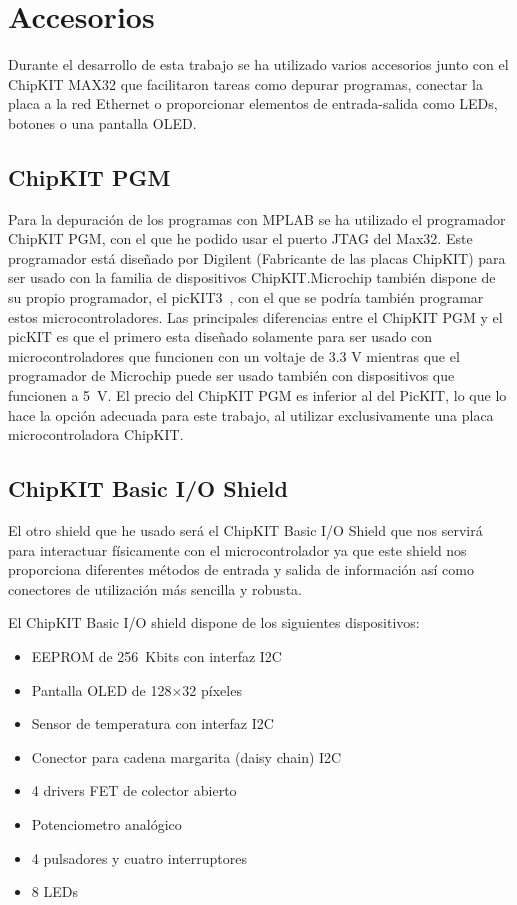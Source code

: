 \section{Accesorios}
Durante el desarrollo de esta trabajo se ha utilizado varios accesorios junto con el ChipKIT MAX32 que facilitaron tareas como depurar programas, conectar la placa a la red Ethernet o proporcionar elementos de entrada-salida como LEDs, botones o una pantalla OLED.\@
\subsection{ChipKIT PGM}
Para la depuración de los programas con MPLAB se ha utilizado el programador ChipKIT PGM\cite{website:pgm}, con el que he podido usar el puerto JTAG del Max32. Este programador está diseñado por Digilent (Fabricante de las placas ChipKIT) para ser usado con la familia de dispositivos ChipKIT.\@ Microchip también dispone de su propio programador, el picKIT3~\cite{website:pickit}, con el que se podría también programar estos microcontroladores. Las principales diferencias entre el ChipKIT PGM y el picKIT es que el primero esta diseñado solamente para ser usado con microcontroladores que funcionen con un voltaje de 3.3 V mientras que el programador de Microchip puede ser usado también con dispositivos que funcionen a 5~V. El precio del ChipKIT PGM es inferior al del PicKIT, lo que lo hace la opción adecuada para este trabajo, al utilizar exclusivamente una placa microcontroladora ChipKIT.


\subsection{ChipKIT Basic I/O Shield}
El otro shield que he usado será el ChipKIT Basic I/O Shield que nos servirá para interactuar físicamente con el microcontrolador ya que este shield nos proporciona diferentes métodos de entrada y salida de información así como conectores de utilización más sencilla y robusta.


El ChipKIT Basic I/O shield dispone de los siguientes dispositivos:
\begin{itemize}
	\item EEPROM de 256~Kbits con interfaz I2C
	\item Pantalla OLED de 128$\times$32 píxeles
	\item Sensor de temperatura con interfaz I2C
	\item Conector para cadena margarita (daisy chain) I2C
	\item 4 drivers FET de colector abierto
	\item Potenciometro analógico
	\item 4 pulsadores y cuatro interruptores
	\item 8 LEDs
\end{itemize}

